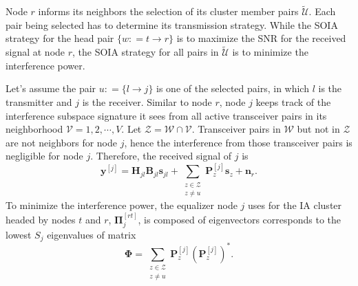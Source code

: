 \documentclass[letterpaper,11pt]{article}
\let\bs\boldsymbol
\begin{document}
Node $r$ informs its neighbors the selection of its cluster member pairs $\tilde{\mathcal{U}}$. Each pair being selected has to determine its transmission strategy. While the SOIA strategy for the head pair $\{w\colon={t\rightarrow r}\}$ is to maximize the SNR for the received signal at node $r$, the SOIA strategy for all pairs in $\tilde{\mathcal{U}}$ is to minimize the interference power. 

Let's assume the pair $u\colon=\{l\rightarrow j\}$ is one of the selected pairs, in which $l$ is the transmitter and $j$ is the receiver. Similar to node $r$, node $j$ keeps track of the interference subspace signature it sees from all active transceiver pairs in its neighborhood $\mathcal{V}={1, 2,\cdots,V}$. Let $\mathcal{Z}={\mathcal{W}}\cap\mathcal{V}$. Transceiver pairs in ${\mathcal{W}}$ but not in ${\mathcal{Z}}$ are not neighbors for node $j$, hence the interference from those transceiver pairs is negligible for node $j$. Therefore, the received signal of $j$ is
\begin{equation}\label{rx_sig}
\displaystyle\boldsymbol{y}^{[j]}=\mathbf{H}_{jl}\mathbf{B}_{jl}\bs{s}_{jl}+\sum_{\substack{z\in\mathcal{Z}\\z\neq u}}\mathbf{P}^{[j]}_{z}\bs{s}_z+\bs{n}_r.
\end{equation}
To minimize the interference power, the equalizer node $j$ uses for the IA cluster headed by nodes $t$ and $r$, $\mathbf{\Pi}^{[rt]}_j$, is composed of eigenvectors corresponds to the lowest $S_j$ eigenvalues of matrix
\begin{equation}\label{}
\mathbf{\Phi}=\sum_{\substack{z\in\mathcal{Z}\\z\neq u}}\mathbf{P}^{[j]}_{z}\left(\mathbf{P}^{[j]}_{z}\right)^{*}.
\end{equation}

\end{document}
